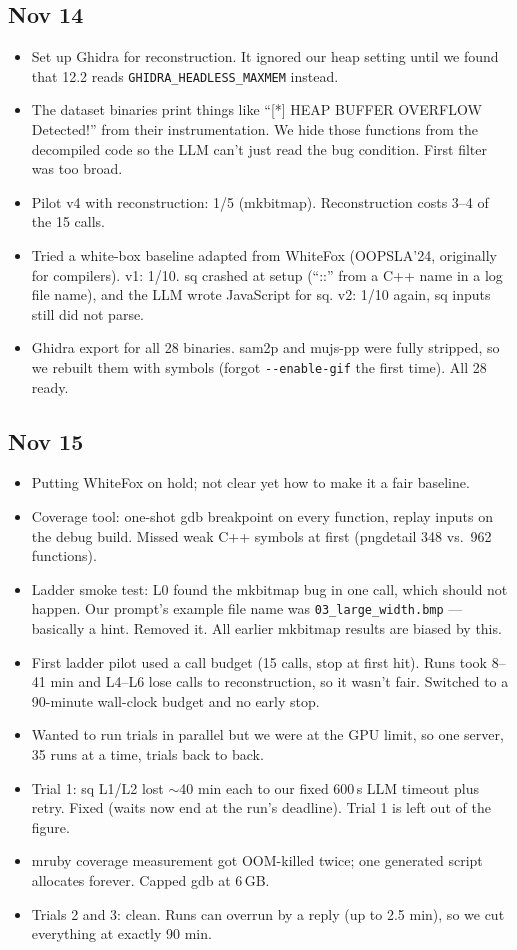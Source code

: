 \documentclass[10pt]{article}
\begin{document}
\subsection*{Nov 14}
\begin{itemize}
\item Set up Ghidra for reconstruction. It ignored our heap setting until we found that 12.2
reads \texttt{GHIDRA\_HEADLESS\_MAXMEM} instead.
\item The dataset binaries print things like ``[*] HEAP BUFFER OVERFLOW Detected!'' from their
instrumentation. We hide those functions from the decompiled code so the LLM can't just read the
bug condition. First filter was too broad.
\item Pilot v4 with reconstruction: 1/5 (mkbitmap). Reconstruction costs 3--4 of the 15 calls.
\item Tried a white-box baseline adapted from WhiteFox (OOPSLA'24, originally for compilers).
v1: 1/10. sq crashed at setup (``::'' from a C++ name in a log file name), and the LLM wrote
JavaScript for sq. v2: 1/10 again, sq inputs still did not parse.
\item Ghidra export for all 28 binaries. sam2p and mujs-pp were fully stripped, so we rebuilt
them with symbols (forgot \texttt{-{}-enable-gif} the first time). All 28 ready.
\end{itemize}

\subsection*{Nov 15}
\begin{itemize}
\item Putting WhiteFox on hold; not clear yet how to make it a fair baseline.
\item Coverage tool: one-shot gdb breakpoint on every function, replay inputs on the debug
build. Missed weak C++ symbols at first (pngdetail 348 vs.\ 962 functions).
\item Ladder smoke test: L0 found the mkbitmap bug in one call, which should not happen. Our
prompt's example file name was \texttt{03\_large\_width.bmp} --- basically a hint. Removed it.
All earlier mkbitmap results are biased by this.
\item First ladder pilot used a call budget (15 calls, stop at first hit). Runs took 8--41 min
and L4--L6 lose calls to reconstruction, so it wasn't fair. Switched to a 90-minute wall-clock
budget and no early stop.
\item Wanted to run trials in parallel but we were at the GPU limit, so one server, 35 runs at
a time, trials back to back.
\item Trial 1: sq L1/L2 lost ${\sim}$40 min each to our fixed 600\,s LLM timeout plus retry.
Fixed (waits now end at the run's deadline). Trial 1 is left out of the figure.
\item mruby coverage measurement got OOM-killed twice; one generated script allocates forever.
Capped gdb at 6\,GB.
\item Trials 2 and 3: clean. Runs can overrun by a reply (up to 2.5 min), so we cut everything
at exactly 90 min.
\end{itemize}
\end{document}
